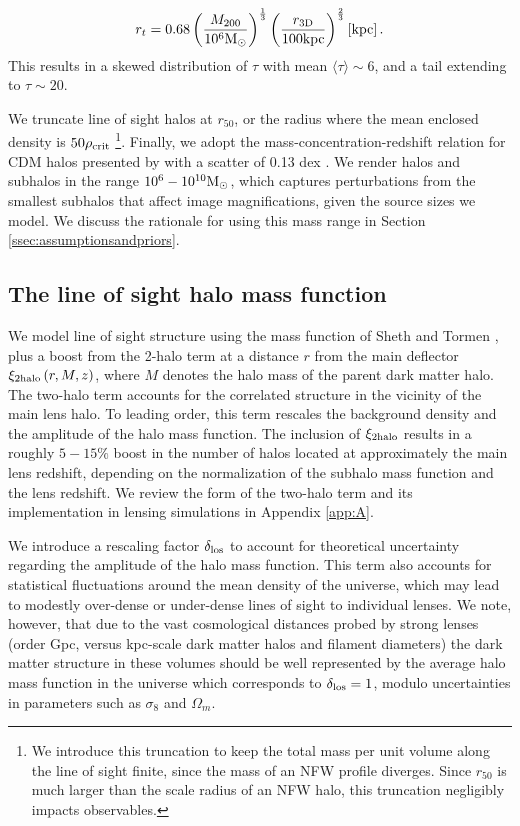 \begin{equation} \label{eqn:truncrad2}
r_t = 0.68 \left(\frac{M_{200}}{10^6 {\rm{M}_{\odot}}}\right)^{\frac{1}{3}} \left(\frac{r_{\rm{3D}}}{100 \rm{kpc}}\right)^{\frac{2}{3}} \left[\rm{kpc}\right].
\end{equation}
This results in a skewed distribution of $\tau$ with mean $\langle \tau \rangle \sim 6$, and a tail extending to $\tau \sim 20$.

We truncate line of sight halos at $r_{50}$, or the radius where the mean enclosed density is $50 \rho_{\rm{crit}}$ \footnote{We introduce this truncation to keep the total mass per unit volume along the line of sight finite, since the mass of an NFW profile diverges. Since $r_{50}$ is much larger than the scale radius of an NFW halo, this truncation negligibly impacts observables.}. Finally, we adopt the mass-concentration-redshift relation for CDM halos presented by \citep{DiemerJoyce18} with a scatter of 0.13 dex \citep{Dutton++14}. We render halos and subhalos in the range $10^6 - 10^{10} {\rm{M}_{\odot}}$, which captures perturbations from the smallest subhalos that affect image magnifications, given the source sizes we model. We discuss the rationale for using this mass range in Section \ref{ssec:assumptionsandpriors}.

\subsection{The line of sight halo mass function}

We model line of sight structure using the mass function of Sheth and Tormen \citep{ST99}, plus a boost from the 2-halo term at a distance $r$ from the main deflector $\xi_{\rm{2halo}}\left(r,M,z\right)$, where $M$ denotes the halo mass of the parent dark matter halo. The two-halo term accounts for the correlated structure in the vicinity of the main lens halo. To leading order, this term rescales the background density and the amplitude of the halo mass function. The inclusion of $\xi_{\rm{2halo}}$ results in a roughly $5-15 \%$ boost in the number of halos located at approximately the main lens redshift, depending on the normalization of the subhalo mass function and the lens redshift. We review the form of the two-halo term and its implementation in lensing simulations in Appendix \ref{app:A}. 

We introduce a rescaling factor ${\delta_{\rm{los}}}$ to account for theoretical uncertainty regarding the amplitude of the halo mass function. This term also accounts for statistical fluctuations around the mean density of the universe, which may lead to modestly over-dense or under-dense lines of sight to individual lenses. We note, however, that due to the vast cosmological distances probed by strong lenses (order Gpc, versus kpc-scale dark matter halos and filament diameters) the dark matter structure in these volumes should be well represented by the average halo mass function in the universe which corresponds to $\delta_{\rm{los}} = 1$, modulo uncertainties in parameters such as $\sigma_8$ and $\Omega_{m}$.


